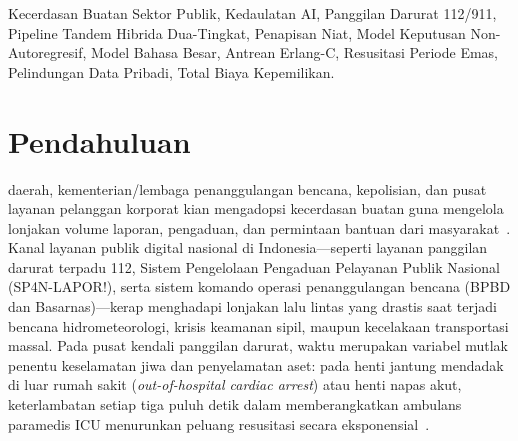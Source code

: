 \documentclass[journal,compsoc]{IEEEtran}
\begin{document}
{\begin{IEEEkeywords}
Kecerdasan Buatan Sektor Publik, Kedaulatan AI, Panggilan Darurat 112/911, Pipeline Tandem Hibrida Dua-Tingkat, Penapisan Niat, Model Keputusan Non-Autoregresif, Model Bahasa Besar, Antrean Erlang-C, Resusitasi Periode Emas, Pelindungan Data Pribadi, Total Biaya Kepemilikan.
\end{IEEEkeywords}}

\maketitle
\IEEEdisplaynontitleabstractindextext
\IEEEpeerreviewmaketitle

\section{Pendahuluan}
 daerah, kementerian/lembaga penanggulangan bencana, kepolisian, dan pusat layanan pelanggan korporat kian mengadopsi kecerdasan buatan guna mengelola lonjakan volume laporan, pengaduan, dan permintaan bantuan dari masyarakat~\cite{achiam2023gpt4,touvron2023llama}. Kanal layanan publik digital nasional di Indonesia—seperti layanan panggilan darurat terpadu 112, Sistem Pengelolaan Pengaduan Pelayanan Publik Nasional (SP4N-LAPOR!), serta sistem komando operasi penanggulangan bencana (BPBD dan Basarnas)—kerap menghadapi lonjakan lalu lintas yang drastis saat terjadi bencana hidrometeorologi, krisis keamanan sipil, maupun kecelakaan transportasi massal. Pada pusat kendali panggilan darurat, waktu merupakan variabel mutlak penentu keselamatan jiwa dan penyelamatan aset: pada henti jantung mendadak di luar rumah sakit (\textit{out-of-hospital cardiac arrest}) atau henti napas akut, keterlambatan setiap tiga puluh detik dalam memberangkatkan ambulans paramedis ICU menurunkan peluang resusitasi secara eksponensial~\cite{zandbergen2022accuracy,eisenberg2001cardiac}.
\end{document}
